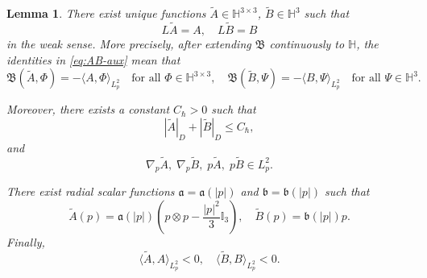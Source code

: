 \documentclass[10pt,reqno]{amsart}
\numberwithin{equation}{section}
\newtheorem{lemma}{Lemma}[section]
\newcommand{\lt}{\left}
\newcommand{\rt}{\right}
\newcommand{\lal}{\langle}
\newcommand{\ral}{\rangle}
\newcommand{\bq}{\begin{equation}}
\newcommand{\eq}{\end{equation}}
\begin{document}
 
\begin{lemma}\label{lem:AB-solv}
There exist unique functions $\widetilde A \in \mathbb{H}^{3\times3}$, $\widetilde B \in \mathbb{H}^3$ such that
\bq\label{eq:AB-aux}
L\widetilde A = A, \quad L\widetilde B = B
\eq
in the weak sense. More precisely, after extending $\mathfrak{B}$ continuously to $\mathbb{H}$, the identities in \eqref{eq:AB-aux} mean that
\bq\label{eq:AB-weak}
\mathfrak{B}(\widetilde A,\Phi)=-\lal A,\Phi\ral_{L^2_p}
\quad\text{for all } \Phi\in\mathbb{H}^{3\times3},
\quad
\mathfrak{B}(\widetilde B,\Psi)=-\lal B,\Psi\ral_{L^2_p}
\quad\text{for all } \Psi\in\mathbb{H}^{3}.
\eq

Moreover, there exists a constant $C_\hbar>0$ such that
\bq\label{eq:AB-D}
| \widetilde A |_D + | \widetilde B |_D \le C_\hbar,
\eq
and
\bq \label{eq:AB-L2}
\nabla_p\widetilde A, \; \nabla_p\widetilde B, \; p\widetilde A, \; p\widetilde B \in L^2_p.
\eq

There exist radial scalar functions $\mathfrak a=\mathfrak a(|p|)$ and $\mathfrak b=\mathfrak b(|p|)$
such that
\[
\widetilde A(p) = \mathfrak a(|p|) \lt( p\otimes p - \frac{|p|^2}{3} \mathbb I_3 \rt),\quad \widetilde B(p) = \mathfrak b(|p|) p.
\]
Finally,
\[
\lal \widetilde A, A \ral_{L^2_p} < 0, \quad \lal \widetilde B, B \ral_{L^2_p} < 0.
\]
\end{lemma}
 
\end{document}
